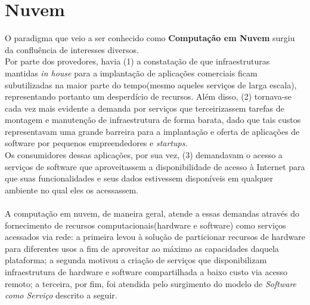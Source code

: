 \section{Nuvem}
O paradigma que veio a ser conhecido como \textbf{Computação em Nuvem} surgiu da confluência de interesses diversos.
\\ Por parte dos provedores, havia (1) a constatação de que infraestruturas mantidas \textit{in house} para a implantação de aplicações comerciais ficam subutilizadas na maior parte do tempo(mesmo aqueles serviços de larga escala), representando portanto um desperdício de recursos. Além disso, (2) tornava-se cada vez mais evidente a demanda por serviços que terceirizassem tarefas de montagem e manutenção de infraestrutura de forma barata, dado que tais custos representavam uma grande barreira para a implantação e oferta de aplicações de software por pequenos empreendedores e \textit{startups}.
\\ Os consumidores dessas aplicações, por sua vez, (3) demandavam o acesso a serviços de software que aproveitassem a disponibilidade de acesso à Internet para que suas funcionalidades e seus dados estivessem disponíveis em qualquer ambiente no qual eles os acessassem.
\\\\ A computação em nuvem, de maneira geral, atende a essas demandas através do fornecimento de recursos computacionais(hardware e software) como serviços acessados via rede\cite{wikiCloud}: a primeira levou à solução de particionar recursos de hardware para diferentes usos a fim de aproveitar ao máximo as capacidades daquela plataforma; a segunda motivou a criação de serviços que disponibilizam infraestrutura de hardware e software compartilhada a baixo custo via acesso remoto; a terceira, por fim, foi atendida pelo surgimento do modelo de \textit{Software como Serviço} descrito a seguir.

